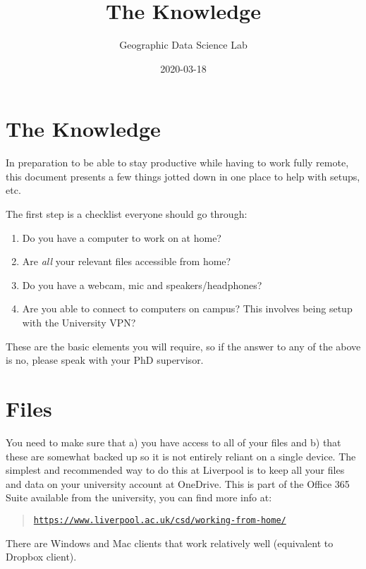 \documentclass[
]{book}
\title{The Knowledge}
\author{Geographic Data Science Lab}
\date{2020-03-18}
\providecommand{\tightlist}{%
  \setlength{\itemsep}{0pt}\setlength{\parskip}{0pt}}
\begin{document}
\maketitle

{
\setcounter{tocdepth}{1}
\tableofcontents
}
\hypertarget{the-knowledge}{%
\chapter{The Knowledge}\label{the-knowledge}}

In preparation to be able to stay productive while having to work fully remote, this document presents a few things jotted down in one place to help with setups, etc.

The first step is a checklist everyone should go through:

\begin{enumerate}
\def\labelenumi{\arabic{enumi}.}
\tightlist
\item
  Do you have a computer to work on at home?
\item
  Are \emph{all} your relevant files accessible from home?
\item
  Do you have a webcam, mic and speakers/headphones?
\item
  Are you able to connect to computers on campus? This involves being setup with the University VPN?
\end{enumerate}

These are the basic elements you will require, so if the answer to any of the above is no, please speak with your PhD supervisor.

\hypertarget{files}{%
\chapter{Files}\label{files}}

You need to make sure that a) you have access to all of your files and b) that
these are somewhat backed up so it is not entirely reliant on a single device.
The simplest and recommended way to do this at Liverpool is to keep all your
files and data on your university account at OneDrive. This is part of the
Office 365 Suite available from the university, you can find more info at:

\begin{quote}
\href{https://www.liverpool.ac.uk/csd/working-from-home/}{\texttt{https://www.liverpool.ac.uk/csd/working-from-home/}}
\end{quote}

There are Windows and Mac clients that work relatively well (equivalent to
Dropbox client).
\end{document}
